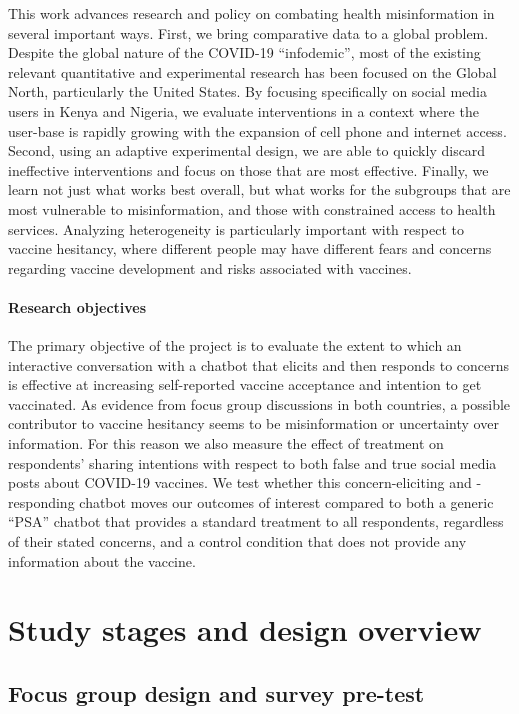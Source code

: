 \documentclass[letterpaper, 12pt, parskip=full,DIV=10]{scrartcl}
\begin{document}
This work advances research and policy on combating health misinformation in several important ways. First, we bring comparative data to a global problem. Despite the global nature of the COVID-19 ``infodemic'', most of the existing relevant quantitative and experimental research has been focused on the Global North, particularly the United States. By focusing specifically on social media users in Kenya and Nigeria, we evaluate interventions in a context where the user-base is rapidly growing with the expansion of cell phone and internet access. Second, using an adaptive experimental design, we are able to quickly discard ineffective interventions and focus on those that are most effective. Finally, we learn not just what works best overall, but what works for the subgroups that are most vulnerable to misinformation, and those with constrained access to health services. Analyzing heterogeneity is particularly important with respect to vaccine hesitancy, where different people may have different fears and concerns regarding vaccine development and risks associated with vaccines. 

\paragraph{Research objectives} 

The primary objective of the project is to evaluate the extent to which an interactive conversation with a chatbot that elicits and then responds to concerns is effective at increasing self-reported vaccine acceptance and intention to get vaccinated. As evidence from focus group discussions in both countries, a possible contributor to vaccine hesitancy seems to be misinformation or uncertainty over information. For this reason we also measure the effect of treatment on respondents' sharing intentions with respect to both false and true social media posts about COVID-19 vaccines. We test whether this concern-eliciting and -responding chatbot moves our outcomes of interest compared to both a generic ``PSA'' chatbot that provides a standard treatment to all respondents, regardless of their stated concerns, and a control condition that does not provide any information about the vaccine.


\section{Study stages and design overview}

\subsection{Focus group design and survey pre-test}
\end{document}
